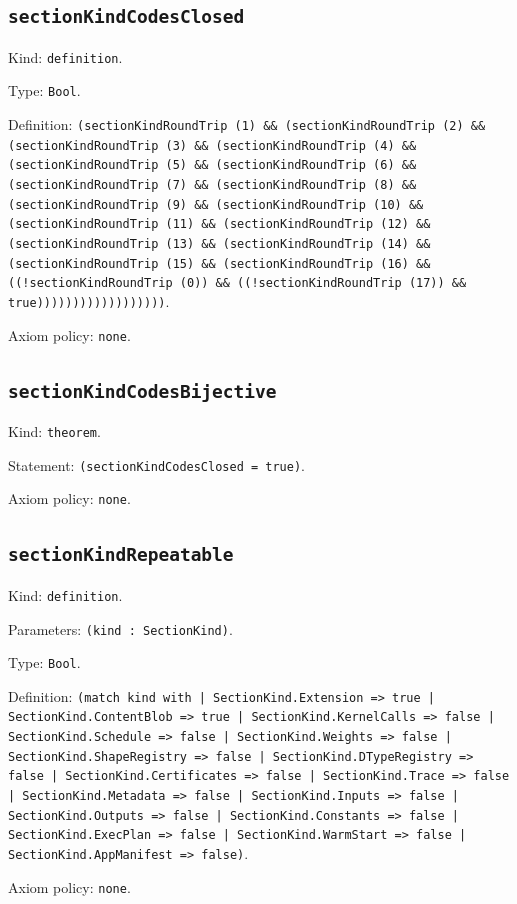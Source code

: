 \documentclass[11pt]{article}
\begin{document}
\subsection*{\texttt{sectionKindCodesClosed}}
\noindent Kind: \texttt{definition}.\par
\noindent Type: \texttt{Bool}.\par
\noindent Definition: \texttt{(sectionKindRoundTrip (1) \&\& (sectionKindRoundTrip (2) \&\& (sectionKindRoundTrip (3) \&\& (sectionKindRoundTrip (4) \&\& (sectionKindRoundTrip (5) \&\& (sectionKindRoundTrip (6) \&\& (sectionKindRoundTrip (7) \&\& (sectionKindRoundTrip (8) \&\& (sectionKindRoundTrip (9) \&\& (sectionKindRoundTrip (10) \&\& (sectionKindRoundTrip (11) \&\& (sectionKindRoundTrip (12) \&\& (sectionKindRoundTrip (13) \&\& (sectionKindRoundTrip (14) \&\& (sectionKindRoundTrip (15) \&\& (sectionKindRoundTrip (16) \&\& ((!sectionKindRoundTrip (0)) \&\& ((!sectionKindRoundTrip (17)) \&\& true))))))))))))))))))}.\par
\noindent Axiom policy: \texttt{none}.\par
\subsection*{\texttt{sectionKindCodesBijective}}
\noindent Kind: \texttt{theorem}.\par
\noindent Statement: \texttt{(sectionKindCodesClosed = true)}.\par
\noindent Axiom policy: \texttt{none}.\par
\subsection*{\texttt{sectionKindRepeatable}}
\noindent Kind: \texttt{definition}.\par
\noindent Parameters: \texttt{(kind : SectionKind)}.\par
\noindent Type: \texttt{Bool}.\par
\noindent Definition: \texttt{(match kind with | SectionKind.Extension => true | SectionKind.ContentBlob => true | SectionKind.KernelCalls => false | SectionKind.Schedule => false | SectionKind.Weights => false | SectionKind.ShapeRegistry => false | SectionKind.DTypeRegistry => false | SectionKind.Certificates => false | SectionKind.Trace => false | SectionKind.Metadata => false | SectionKind.Inputs => false | SectionKind.Outputs => false | SectionKind.Constants => false | SectionKind.ExecPlan => false | SectionKind.WarmStart => false | SectionKind.AppManifest => false)}.\par
\noindent Axiom policy: \texttt{none}.\par
\end{document}
